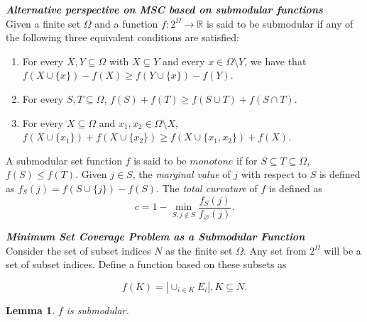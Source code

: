 \documentclass[12pt]{article}
\newcommand{\sr}{\mathbb{R}}
\newcommand{\labs}{\left|}
\newcommand{\rabs}{\right|}
\newcommand{\subheading}[1]{\emph{\textbf{#1}}}
\newtheorem{lem}[thm]{Lemma}
\begin{document}
\subheading{Alternative perspective on MSC based on submodular functions}\\

Given a finite set $\Omega$ and a function $f:2^{\Omega} \rightarrow \sr$ is said to be submodular if any of the following three equivalent conditions are satisfied:

\begin{enumerate}
\item For every $X, Y \subseteq \Omega$ with $X \subseteq Y$ and every $x \in \Omega \setminus Y$, we have that $f(X \cup \{x\}) - f(X) \geq f(Y \cup \{x\}) - f(Y)$.
\item For every $S, T \subseteq \Omega$, $f(S) + f(T) \geq f(S \cup T) + f(S \cap T)$.
\item For every $X \subseteq \Omega$ and $x_1, x_2 \in \Omega \setminus X$, $f(X \cup \{x_1\}) + f(X \cup \{x_2\}) \geq f(X \cup \{x_1,x_2\}) + f(X)$.
\end{enumerate}

A submodular set function $f$ is said to be $monotone$ if for $S \subseteq T \subseteq \Omega$, $f(S) \leq f(T)$. Given $j \in S$, the \textit{marginal value} of $j$ with respect to $S$ is defined as $f_S(j) = f(S \cup \{j\}) - f(S)$. The \textit{total curvature} of $f$ is defined as
\[ c = 1 - \min_{S,j \notin S} \frac{f_S(j)}{f_{\varnothing}(j)}.\]

\subheading{Minimum Set Coverage Problem as a Submodular Function}\\

Consider the set of subset indices $N$ as the finite set $\Omega$. Any set from $2^{\Omega}$ will be a set of subset indices. Define a function based on these subsets as

\[f(K) = \labs \cup_{i \in K} E_i \rabs, K \subseteq N.\]

\begin{lem}\label{lem:submod}
$f$ is submodular.
\end{lem}
\end{document}
